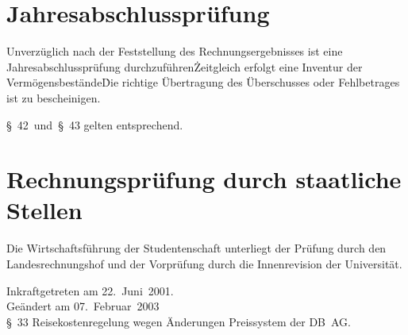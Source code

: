 \begin{multicols}{2}
\section{Jahresabschlussprüfung}

\Abs \Satz Unverzüglich nach der Feststellung des Rechnungsergebnisses ist eine Jahresabschlussprüfung durchzuführen\. Zeitgleich erfolgt eine Inventur der Vermögensbestände\. Die richtige Übertragung des Überschusses oder Fehlbetrages ist zu bescheinigen.

\Abs \Satz §~42~und~§~43 gelten entsprechend.

\section{Rechnungsprüfung durch staatliche Stellen}

\Abs \Satz Die Wirtschaftsführung der Studentenschaft unterliegt der Prüfung durch den Landesrechnungshof und der Vorprüfung durch die Innenrevision der Universität.

\end{multicols}

\nopagebreak
\vspace{1cm}
Inkraftgetreten am 22.~Juni~2001.
\\


\footnotesize
Geändert am 07.~Februar~2003\\
§~33 Reisekostenregelung wegen Änderungen Preissystem der DB~AG.

